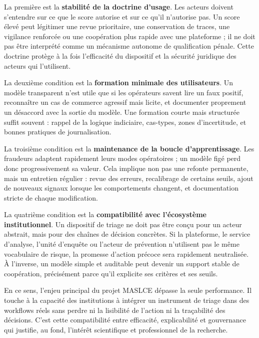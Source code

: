\documentclass[10pt,a4paper]{article}
\begin{document}
La première est la \textbf{stabilité de la doctrine d'usage}. Les acteurs doivent s'entendre sur ce que le score autorise et sur ce qu'il n'autorise pas. Un score élevé peut légitimer une revue prioritaire, une conservation de traces, une vigilance renforcée ou une coopération plus rapide avec une plateforme ; il ne doit pas être interprété comme un mécanisme autonome de qualification pénale. Cette doctrine protège à la fois l'efficacité du dispositif et la sécurité juridique des acteurs qui l'utilisent.

La deuxième condition est la \textbf{formation minimale des utilisateurs}. Un modèle transparent n'est utile que si les opérateurs savent lire un faux positif, reconnaître un cas de commerce agressif mais licite, et documenter proprement un désaccord avec la sortie du modèle. Une formation courte mais structurée suffit souvent : rappel de la logique indiciaire, cas-types, zones d'incertitude, et bonnes pratiques de journalisation.

La troisième condition est la \textbf{maintenance de la boucle d'apprentissage}. Les fraudeurs adaptent rapidement leurs modes opératoires ; un modèle figé perd donc progressivement sa valeur. Cela implique non pas une refonte permanente, mais un entretien régulier : revue des erreurs, recalibrage de certains seuils, ajout de nouveaux signaux lorsque les comportements changent, et documentation stricte de chaque modification.

La quatrième condition est la \textbf{compatibilité avec l'écosystème institutionnel}. Un dispositif de triage ne doit pas être conçu pour un acteur abstrait, mais pour des chaînes de décision concrètes. Si la plateforme, le service d'analyse, l'unité d'enquête ou l'acteur de prévention n'utilisent pas le même vocabulaire de risque, la promesse d'action précoce sera rapidement neutralisée. À l'inverse, un modèle simple et auditable peut devenir un support stable de coopération, précisément parce qu'il explicite ses critères et ses seuils.

En ce sens, l'enjeu principal du projet MASLCE dépasse la seule performance. Il touche à la capacité des institutions à intégrer un instrument de triage dans des workflows réels sans perdre ni la lisibilité de l'action ni la traçabilité des décisions. C'est cette compatibilité entre efficacité, explicabilité et gouvernance qui justifie, au fond, l'intérêt scientifique et professionnel de la recherche.


\newpage
\end{document}
